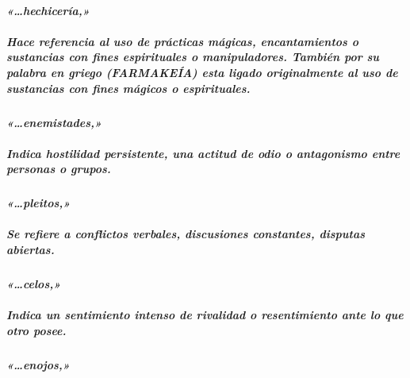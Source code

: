 \documentclass[11a pt,twoside]{article}
\newcommand{\scripture}[1]{%
  {\fontsize{12pt}{16pt}\selectfont\ScriptureFont\itshape #1}%
}
\let\oldparagraph\paragraph
\renewcommand{\paragraph}{\needspace{3\baselineskip}\oldparagraph}
\let\oldsubparagraph\subparagraph
\renewcommand{\subparagraph}{\needspace{2\baselineskip}\oldsubparagraph}
\begin{document}
\paragraph{\texorpdfstring{\scripture{«…hechicería,»}}{}}\label{hechiceruxeda}

\subparagraph{Hace referencia al uso de prácticas mágicas,
encantamientos o sustancias con fines espirituales o manipuladores.
También por su palabra en griego (FARMAKEÍA) esta ligado originalmente
al uso de sustancias con fines mágicos o
espirituales.}\label{hace-referencia-al-uso-de-pruxe1cticas-muxe1gicas-encantamientos-o-sustancias-con-fines-espirituales-o-manipuladores.-tambiuxe9n-por-su-palabra-en-griego-farmakeuxeda-esta-ligado-originalmente-al-uso-de-sustancias-con-fines-muxe1gicos-o-espirituales.}

\paragraph{\texorpdfstring{\scripture{«…enemistades,»}}{}}\label{enemistades}

\subparagraph{Indica hostilidad persistente, una actitud de odio o
antagonismo entre personas o
grupos.}\label{indica-hostilidad-persistente-una-actitud-de-odio-o-antagonismo-entre-personas-o-grupos.}

\paragraph{\texorpdfstring{\scripture{«…pleitos,»}}{}}\label{pleitos}

\subparagraph{Se refiere a conflictos verbales, discusiones constantes,
disputas
abiertas.}\label{se-refiere-a-conflictos-verbales-discusiones-constantes-disputas-abiertas.}

\paragraph{\texorpdfstring{\scripture{«…celos,»}}{}}\label{celos}

\subparagraph{Indica un sentimiento intenso de rivalidad o resentimiento
ante lo que otro
posee.}\label{indica-un-sentimiento-intenso-de-rivalidad-o-resentimiento-ante-lo-que-otro-posee.}

\paragraph{\texorpdfstring{\scripture{«…enojos,»}}{}}\label{enojos}
\end{document}

